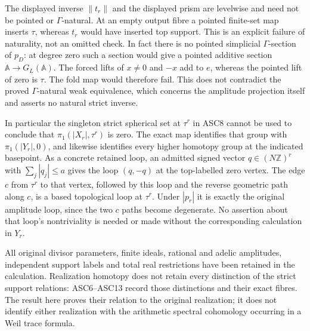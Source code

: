 The displayed inverse $\|t_r\|$ and the displayed prism are
levelwise and need not be pointed or $\Gamma$-natural. At an
empty output fibre a pointed finite-set map inserts $\tau$,
whereas $t_r$ would have inserted top support. This is an explicit
failure of naturality, not an omitted check. In fact there is
no pointed simplicial $\Gamma$-section of $p_D$: at degree zero
such a section would give a pointed additive section
$\mathbb A\to G_L(\mathbb A)$. The forced lifts of $x\ne0$
and $-x$ add to $e$, whereas the pointed lift of zero is $\tau$.
The fold map would therefore fail. This does not contradict the
proved $\Gamma$-natural weak equivalence, which concerns the
amplitude projection itself and asserts no natural strict inverse.

In particular the singleton strict spherical set at $\tau^r$ in
ASC8 cannot be used to conclude that $\pi_1(|X_r|,\tau^r)$ is
zero. The exact map identifies that group with
$\pi_1(|Y_r|,0)$, and likewise identifies every higher homotopy
group at the indicated basepoint. As a concrete retained loop,
an admitted signed vector $q\in(N\mathbb Z)^r$ with
$\sum_j|q_j|\le a$ gives the loop $(q,-q)$ at the top-labelled
zero vertex. The edge $c$ from $\tau^r$ to that vertex, followed
by this loop and the reverse geometric path along $c$, is a
based topological loop at $\tau^r$. Under $|p_r|$ it is exactly
the original amplitude loop, since the two $c$ paths become
degenerate. No assertion about that loop's nontriviality is needed
or made without the corresponding calculation in $Y_r$.

All original divisor parameters, finite ideals, rational and
adelic amplitudes, independent support labels and total real
restrictions have been retained in the calculation. Realization
homotopy does not retain every distinction of the strict support
relations: ASC6--ASC13 record those distinctions and their exact
fibres. The result here proves their relation to the original
realization; it does not identify either realization with the
arithmetic spectral cohomology occurring in a Weil trace formula.
